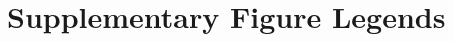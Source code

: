 \documentclass[10pt]{article}
\begin{document}
\clearpage



\clearpage

\normalsize



\section*{Supplementary Figure Legends}

\clearpage

\renewcommand{\thefigure}{S\arabic{figure}}
\setcounter{figure}{0}











\end{document}
